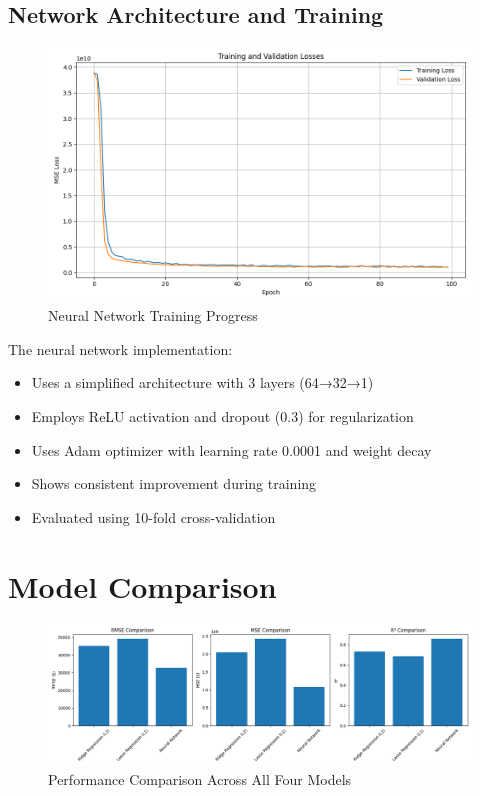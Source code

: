 \subsection{Network Architecture and Training}
\begin{figure}[H]
    \centering
    \includegraphics[width=1.0\textwidth]{figures/neural_network_training.png}
    \caption{Neural Network Training Progress}
    \label{fig:nn_training}
\end{figure}

The neural network implementation:
\begin{itemize}
    \item Uses a simplified architecture with 3 layers (64→32→1)
    \item Employs ReLU activation and dropout (0.3) for regularization
    \item Uses Adam optimizer with learning rate 0.0001 and weight decay
    \item Shows consistent improvement during training
    \item Evaluated using 10-fold cross-validation
\end{itemize}

\section{Model Comparison}
\begin{figure}[H]
    \centering
    \includegraphics[width=1.0\textwidth]{figures/model_comparison.png}
    \caption{Performance Comparison Across All Four Models}
    \label{fig:model_comparison}
\end{figure}

